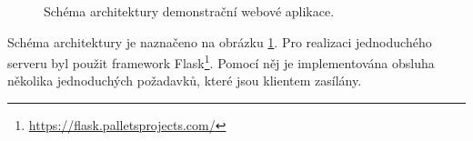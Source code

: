 \begin{figure}[hbt]
	\centering
	\caption{Schéma architektury demonstrační webové aplikace.}
	\label{web_demo_schema}
\end{figure}

Schéma architektury je naznačeno na obrázku \ref{web_demo_schema}. Pro realizaci jednoduchého serveru byl použit framework Flask\footnote{\url{https://flask.palletsprojects.com/}}. Pomocí něj je implementována obsluha několika jednoduchých požadavků, které jsou klientem zasílány.\par

